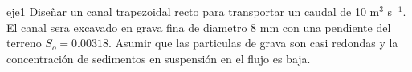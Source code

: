 \documentclass[11pt, oneside]{article}
\begin{document}
\begin{eje}{}{eje1}
Diseñar un canal trapezoidal recto para transportar un caudal de 10 m$^3$ s$^{-1}$. El canal sera excavado en grava fina de diametro 8 mm  con una pendiente del terreno $S_o = 0.00318$. Asumir que las particulas de grava son casi redondas y la concentraci\'on de sedimentos en suspensi\'on en el flujo es baja. 
\end{eje}



\end{document}

